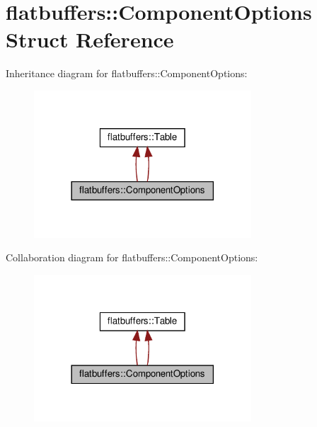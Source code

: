 \hypertarget{structflatbuffers_1_1ComponentOptions}{}\section{flatbuffers\+:\+:Component\+Options Struct Reference}
\label{structflatbuffers_1_1ComponentOptions}


Inheritance diagram for flatbuffers\+:\+:Component\+Options\+:
\nopagebreak
\begin{figure}[H]
\begin{center}
\leavevmode
\includegraphics[width=230pt]{structflatbuffers_1_1ComponentOptions__inherit__graph}
\end{center}
\end{figure}


Collaboration diagram for flatbuffers\+:\+:Component\+Options\+:
\nopagebreak
\begin{figure}[H]
\begin{center}
\leavevmode
\includegraphics[width=230pt]{structflatbuffers_1_1ComponentOptions__coll__graph}
\end{center}
\end{figure}
